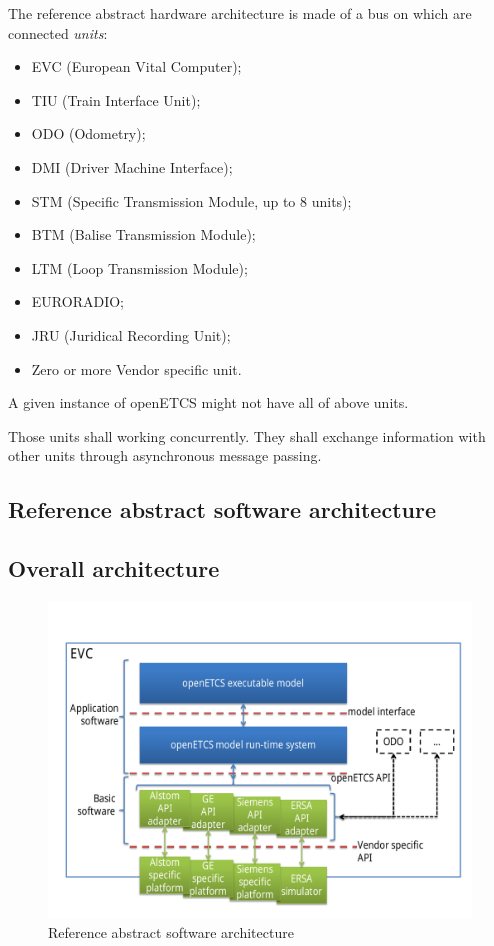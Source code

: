 \documentclass{template/openetcs_report}
\newcommand{\define}[1]{\index{#1}\emph{#1}}
\begin{document}
The reference abstract hardware architecture is made of a bus on which
are connected \define{units}:
\begin{itemize}
\item EVC (European Vital Computer);
\item TIU (Train Interface Unit);
\item ODO (Odometry);
\item DMI (Driver Machine Interface);
\item STM (Specific Transmission Module, up to 8 units);
\item BTM (Balise Transmission Module);
\item LTM (Loop Transmission Module);
\item EURORADIO;
\item JRU (Juridical Recording Unit);
\item Zero or more Vendor specific unit.
\end{itemize}

A given instance of openETCS might not have all of above
units. 

Those units shall working concurrently. They shall exchange
information with other units through asynchronous message passing.


\subsection{Reference abstract software architecture}
\label{software-arch}

\subsection{Overall architecture}

\begin{figure}[htbp]
  \centering
  \includegraphics[width=\linewidth]{software-architecture.pdf}
  \caption{Reference abstract software architecture}
  \label{fig:software-arch}
\end{figure}
\end{document}
